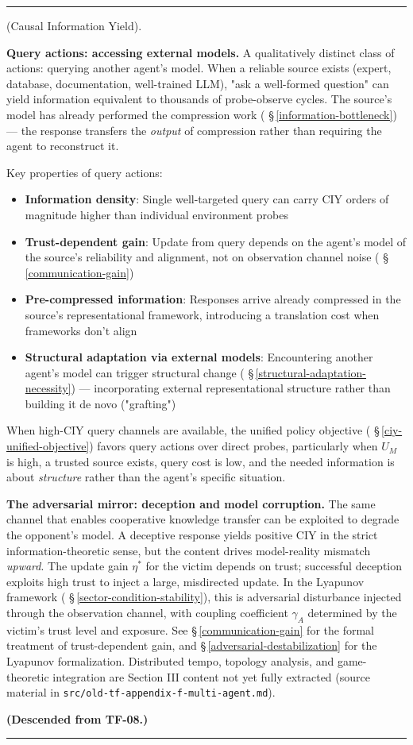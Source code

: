\documentclass[11pt,oneside]{article}
\newcounter{claim}[section]
\renewcommand{\theclaim}{\thesection.\arabic{claim}}
\newenvironment{segment}[2]{%
  \refstepcounter{claim}%
  \bigskip\noindent\hrule\smallskip
  \noindent{\bfseries #1~\theclaim}\enskip(#2).\par\smallskip
  \noindent\ignorespaces
}{%
  \par\smallskip\noindent\hrule\bigskip
}
\newenvironment{definition}[1][]{\begin{segment}{Definition}{#1}}{\end{segment}}
\begin{document}
\begin{definition}[Causal Information Yield]
\textbf{Query actions: accessing external models.} A qualitatively distinct class of actions: querying another agent's model. When a reliable source exists (expert, database, documentation, well-trained LLM), "ask a well-formed question" can yield information equivalent to thousands of probe-observe cycles. The source's model has already performed the compression work ( \S\,\ref{information-bottleneck}) — the response transfers the \textit{output} of compression rather than requiring the agent to reconstruct it.

Key properties of query actions:
\begin{itemize}
  \item \textbf{Information density}: Single well-targeted query can carry CIY orders of magnitude higher than individual environment probes
  \item \textbf{Trust-dependent gain}: Update from query depends on the agent's model of the source's reliability and alignment, not on observation channel noise ( \S\,\ref{communication-gain})
  \item \textbf{Pre-compressed information}: Responses arrive already compressed in the source's representational framework, introducing a translation cost when frameworks don't align
  \item \textbf{Structural adaptation via external models}: Encountering another agent's model can trigger structural change ( \S\,\ref{structural-adaptation-necessity}) — incorporating external representational structure rather than building it de novo ("grafting")
\end{itemize}


When high-CIY query channels are available, the unified policy objective ( \S\,\ref{ciy-unified-objective}) favors query actions over direct probes, particularly when $U_M$ is high, a trusted source exists, query cost is low, and the needed information is about \textit{structure} rather than the agent's specific situation.

\textbf{The adversarial mirror: deception and model corruption.} The same channel that enables cooperative knowledge transfer can be exploited to degrade the opponent's model. A deceptive response yields positive CIY in the strict information-theoretic sense, but the content drives model-reality mismatch \textit{upward}. The update gain $\eta^*$ for the victim depends on trust; successful deception exploits high trust to inject a large, misdirected update. In the Lyapunov framework ( \S\,\ref{sector-condition-stability}), this is adversarial disturbance injected through the observation channel, with coupling coefficient $\gamma_A$ determined by the victim's trust level and exposure. See \S\,\ref{communication-gain} for the formal treatment of trust-dependent gain, and \S\,\ref{adversarial-destabilization} for the Lyapunov formalization. Distributed tempo, topology analysis, and game-theoretic integration are Section III content not yet fully extracted (source material in \texttt{src/old-tf-appendix-f-multi-agent.md}).

\textbf{(Descended from TF-08.)}

\end{definition}
\end{document}
